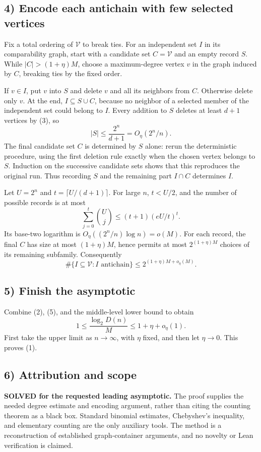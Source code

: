 \subsection*{4) Encode each antichain with few selected vertices}
Fix a total ordering of $\mathcal V$ to break ties. For an independent set $I$ in its comparability graph, start with a candidate set $C=\mathcal V$ and an empty record $S$. While $|C|>(1+\eta)M$, choose a maximum-degree vertex $v$ in the graph induced by $C$, breaking ties by the fixed order.

If $v\in I$, put $v$ into $S$ and delete $v$ and all its neighbors from $C$. Otherwise delete only $v$. At the end, $I\subseteq S\cup C$, because no neighbor of a selected member of the independent set could belong to $I$. Every addition to $S$ deletes at least $d+1$ vertices by (3), so
\[|S|\le\frac{2^n}{d+1}=O_\eta(2^n/n).\tag{4}\]
The final candidate set $C$ is determined by $S$ alone: rerun the deterministic procedure, using the first deletion rule exactly when the chosen vertex belongs to $S$. Induction on the successive candidate sets shows that this reproduces the original run. Thus recording $S$ and the remaining part $I\cap C$ determines $I$.

Let $U=2^n$ and $t=\lceil U/(d+1)\rceil$. For large $n$, $t<U/2$, and the number of possible records is at most
\[\sum_{j=0}^t\binom Uj\le(t+1)(eU/t)^t.
\]
Its base-two logarithm is $O_\eta((2^n/n)\log n)=o(M)$. For each record, the final $C$ has size at most $(1+\eta)M$, hence permits at most $2^{(1+\eta)M}$ choices of its remaining subfamily. Consequently
\[\#\{I\subseteq\mathcal V:I\text{ antichain}\}
\le2^{(1+\eta)M+o_\eta(M)}.\tag{5}\]

\subsection*{5) Finish the asymptotic}
Combine (2), (5), and the middle-level lower bound to obtain
\[1\le\frac{\log_2D(n)}M\le1+\eta+o_\eta(1).
\]
First take the upper limit as $n\to\infty$, with $\eta$ fixed, and then let $\eta\to0$. This proves (1).

\subsection*{6) Attribution and scope}
\textbf{SOLVED for the requested leading asymptotic.} The proof supplies the needed degree estimate and encoding argument, rather than citing the counting theorem as a black box. Standard binomial estimates, Chebyshev's inequality, and elementary counting are the only auxiliary tools. The method is a reconstruction of established graph-container arguments, and no novelty or Lean verification is claimed.

